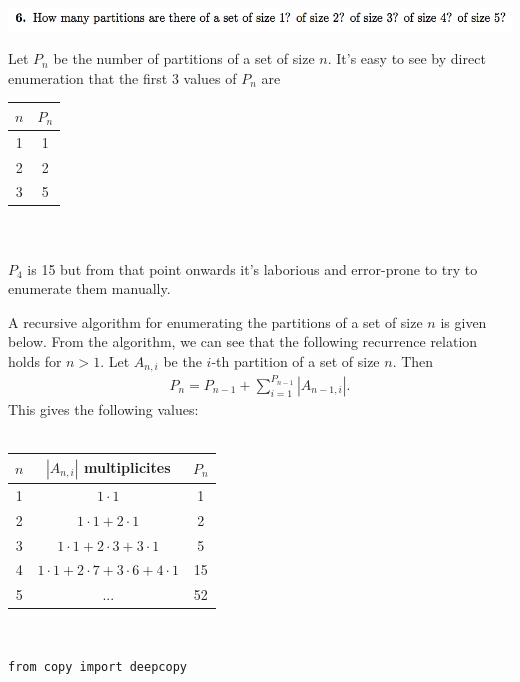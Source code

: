 \documentclass[12pt]{article}
\begin{document}
\subsection*{} %
\includegraphics[width=400pt]{img/iulm-1-6.png}
\begin{mdframed}
  Let $P_n$ be the number of partitions of a set of size $n$. It's easy to see
  by direct enumeration that the first 3 values of $P_n$ are
  \\
  \begin{tabular}{c|c}
    $n$ & $P_n$\\
    \hline
    1 & 1\\
    2 & 2 \\
    3 & 5 \\
  \end{tabular}\\
  \\
  $P_4$ is 15 but from that point onwards it's laborious and error-prone to try
  to enumerate them manually.

  A recursive algorithm for enumerating the partitions of a set of size $n$ is
  given below. From the algorithm, we can see that the following recurrence
  relation holds for $n > 1$. Let $A_{n,i}$ be the $i$-th partition of a set of
  size $n$. Then
  \begin{align*}
    P_n = P_{n-1} + \sum_{i=1}^{P_{n-1}}|A_{n-1,i}|.
  \end{align*}
  This gives the following values:\\\\
  \begin{tabular}{c|c|c}
    $n$ & $|A_{n,i}|$ multiplicites& $P_n$\\
    \hline
    1 & $1 \cdot 1$                                     & 1  \\
    2 & $1 \cdot 1 + 2 \cdot 1$                         & 2  \\
    3 & $1 \cdot 1 + 2 \cdot 3 + 3 \cdot 1$             & 5  \\
    4 & $1 \cdot 1 + 2 \cdot 7 + 3 \cdot 6 + 4 \cdot 1$ & 15 \\
    5 & ...                                             & 52 \\
  \end{tabular}\\
  \newpage
  \begin{verbatim}
from copy import deepcopy


\end{verbatim}
\end{mdframed}
\end{document}
